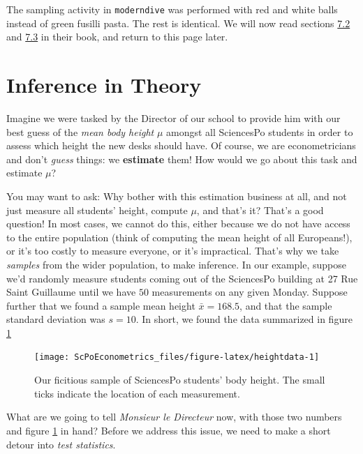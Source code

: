 \documentclass[]{book}
\begin{document}
The sampling activity in \texttt{moderndive} was performed with red and white balls instead of green fusilli pasta. The rest is identical. We will now read sections \href{https://moderndive.com/7-sampling.html\#sampling-simulation}{7.2} and \href{https://moderndive.com/7-sampling.html\#sampling-framework}{7.3} in their book, and return to this page later.

\hypertarget{inference-in-theory}{%
\section{Inference in Theory}\label{inference-in-theory}}

Imagine we were tasked by the Director of our school to provide him with our best guess of the \emph{mean body height} \(\mu\) amongst all SciencesPo students in order to assess which height the new desks should have. Of course, we are econometricians and don't \emph{guess} things: we \textbf{estimate} them! How would we go about this task and estimate \(\mu\)?

You may want to ask: Why bother with this estimation business at all, and not just measure all students' height, compute \(\mu\), and that's it? That's a good question! In most cases, we cannot do this, either because we do not have access to the entire population (think of computing the mean height of all Europeans!), or it's too costly to measure everyone, or it's impractical. That's why we take \emph{samples} from the wider population, to make inference. In our example, suppose we'd randomly measure students coming out of the SciencesPo building at 27 Rue Saint Guillaume until we have \(50\) measurements on any given Monday. Suppose further that we found a sample mean height \(\bar{x} = 168.5\), and that the sample standard deviation was \(s=10\). In short, we found the data summarized in figure \ref{fig:heightdata}

\begin{figure}

{\centering \texttt{[image: ScPoEconometrics\_files/figure-latex/heightdata-1]} 

}

\caption{Our ficitious sample of SciencesPo students' body height. The small ticks indicate the location of each measurement.}\label{fig:heightdata}
\end{figure}

What are we going to tell \emph{Monsieur le Directeur} now, with those two numbers and figure \ref{fig:heightdata} in hand? Before we address this issue, we need to make a short detour into \emph{test statistics}.
\end{document}
